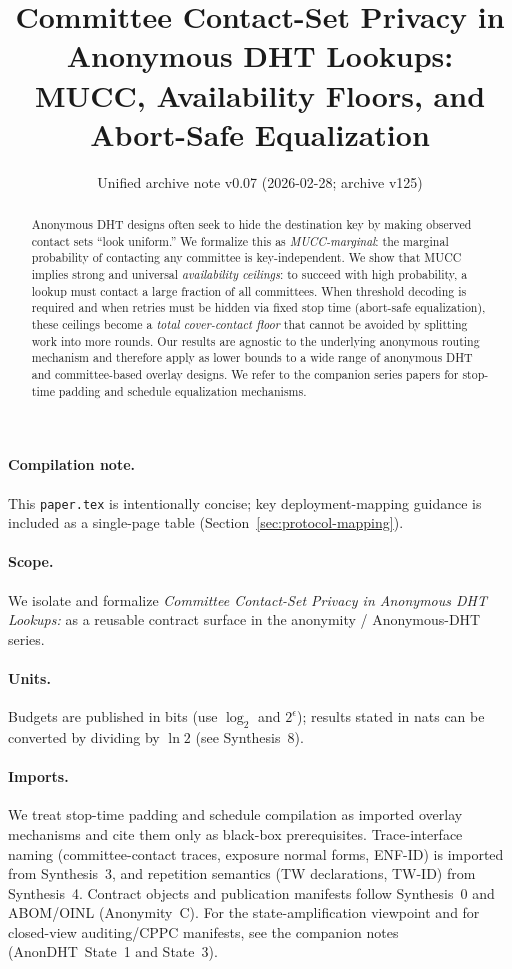 \documentclass[11pt]{article}
\title{Committee Contact-Set Privacy in Anonymous DHT Lookups:\\MUCC, Availability Floors, and Abort-Safe Equalization}
\author{}
\date{Unified archive note v0.07 (2026-02-28; archive v125)}
\begin{document}
\maketitle

\begin{abstract}
Anonymous DHT designs often seek to hide the destination key by making observed contact sets
``look uniform.'' We formalize this as \emph{MUCC-marginal}: the marginal probability of contacting any committee
is key-independent.
We show that MUCC implies strong and universal \emph{availability ceilings}:
to succeed with high probability, a lookup must contact a large fraction of all committees.
When threshold decoding is required and when retries must be hidden via fixed stop time (abort-safe equalization),
these ceilings become a \emph{total cover-contact floor} that cannot be avoided by splitting work into more rounds.
Our results are agnostic to the underlying anonymous routing mechanism and therefore apply as lower bounds
to a wide range of anonymous DHT and committee-based overlay designs.
We refer to the companion series papers for stop-time padding and schedule equalization mechanisms.
\end{abstract}

\paragraph{Compilation note.}
This \texttt{paper.tex} is intentionally concise; key deployment-mapping guidance is included as a single-page table (Section~\ref{sec:protocol-mapping}).


\paragraph{Scope.}
We isolate and formalize \emph{Committee Contact-Set Privacy in Anonymous DHT Lookups:} as a reusable contract surface in the anonymity / Anonymous-DHT series.

\paragraph{Units.} Budgets are published in bits (use $\log_2$ and $2^{\epsilon}$); results stated in nats can be converted by dividing by $\ln 2$ (see Synthesis~8).\cite{series:notation}

\paragraph{Imports.}
We treat stop-time padding and schedule compilation as imported overlay mechanisms and cite them only as black-box prerequisites.\cite{series:stoptimeaddendum,series:schedcompiler}
Trace-interface naming (committee-contact traces, exposure normal forms, ENF-ID) is imported from Synthesis~3, and repetition semantics (TW declarations, TW-ID) from Synthesis~4.\cite{series:traceifaces,series:threatwindows}
Contract objects and publication manifests follow Synthesis~0 and ABOM/OINL (Anonymity~C).\cite{series:contractobjects,series:abomoinl}
For the state-amplification viewpoint and for closed-view auditing/CPPC manifests, see the companion notes (AnonDHT~State~1 and State~3).\cite{series:state1,series:state3}
\end{document}
